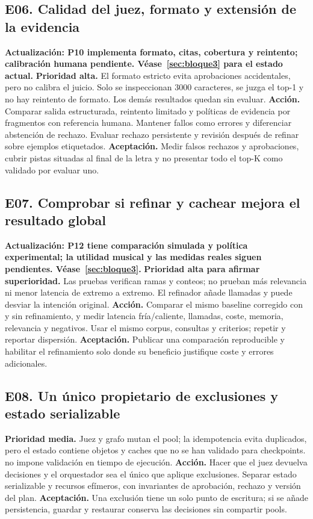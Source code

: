 \subsection{E06. Calidad del juez, formato y extensión de la evidencia}
\textbf{Actualización: P10 implementa formato, citas, cobertura y reintento;
calibración humana pendiente. Véase~\ref{sec:bloque3} para el estado actual.}
\textbf{Prioridad alta.} El formato estricto evita aprobaciones accidentales,
pero no calibra el juicio. Solo se inspeccionan 3000 caracteres, se juzga el
top-1 y no hay reintento de formato. Los demás resultados quedan sin evaluar.
\textbf{Acción.} Comparar salida estructurada, reintento limitado y políticas
de evidencia por fragmentos con referencia humana. Mantener fallos como errores
y diferenciar abstención de rechazo. Evaluar rechazo persistente y revisión
después de refinar sobre ejemplos etiquetados.
\textbf{Aceptación.} Medir falsos rechazos y aprobaciones, cubrir pistas situadas
al final de la letra y no presentar todo el top-K como validado por evaluar uno.

\subsection{E07. Comprobar si refinar y cachear mejora el resultado global}
\textbf{Actualización: P12 tiene comparación simulada y política experimental;
la utilidad musical y las medidas reales siguen pendientes. Véase~\ref{sec:bloque3}.}
\textbf{Prioridad alta para afirmar superioridad.} Las pruebas verifican ramas y
conteos; no prueban más relevancia ni menor latencia de extremo a extremo.
El refinador añade llamadas y puede desviar la intención original.
\textbf{Acción.} Comparar el mismo baseline corregido con y sin refinamiento,
y medir latencia fría/caliente, llamadas, coste, memoria, relevancia y negativos.
Usar el mismo corpus, consultas y criterios; repetir y reportar dispersión.
\textbf{Aceptación.} Publicar una comparación reproducible y habilitar el
refinamiento solo donde su beneficio justifique coste y errores adicionales.

\subsection{E08. Un único propietario de exclusiones y estado serializable}
\textbf{Prioridad media.} Juez y grafo mutan el pool; la idempotencia evita
duplicados, pero el estado contiene objetos y caches que no se han validado para
checkpoints.  no impone validación en tiempo de ejecución.
\textbf{Acción.} Hacer que el juez devuelva decisiones y el orquestador sea el
único que aplique exclusiones. Separar estado serializable y recursos efímeros,
con invariantes de aprobación, rechazo y versión del plan.
\textbf{Aceptación.} Una exclusión tiene un solo punto de escritura; si se añade
persistencia, guardar y restaurar conserva las decisiones sin compartir pools.


